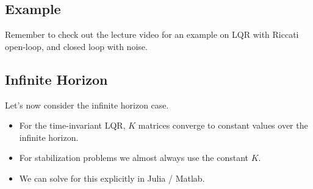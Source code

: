 \subsection{Example}
Remember to check out the lecture video for an example on LQR with Riccati open-loop, and closed loop with noise. 

\subsection{Infinite Horizon}
Let's now consider the infinite horizon case.
\begin{itemize}
    \item For the time-invariant LQR, $K$ matrices converge to constant values over the infinite horizon. 
    \item For stabilization problems we almost always use the constant $K$.
    \item We can solve for this explicitly in Julia / Matlab.
\end{itemize}

